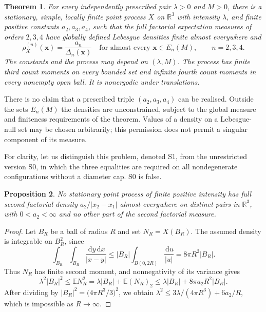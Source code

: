 \documentclass[11pt,a4paper]{article}
\numberwithin{equation}{section}
\newtheorem{theorem}{Theorem}[section]
\newtheorem{proposition}[theorem]{Proposition}
\theoremstyle{definition}
\theoremstyle{remark}
\newcommand{\R}{\mathbb R}
\newcommand{\E}{\mathbb E}
\newcommand{\dd}{\,\mathrm d}
\begin{document}
\begin{theorem}\label{thm:main}
For every independently prescribed pair $\lambda>0$ and $M>0$, there is a
stationary, simple, locally finite point process $X$ on $\R^3$ with intensity
$\lambda$, and finite positive constants $a_2,a_3,a_4$, such that the full
factorial expectation measures of orders $2,3,4$ have globally defined
Lebesgue densities finite almost everywhere and
\begin{equation}
 \rho_X^{(n)}(\mathbf x)=\frac{a_n}{\Delta_n(\mathbf x)}
 \quad\text{for almost every }\mathbf x\in E_n(M),\qquad n=2,3,4.
 \label{eq:target}
\end{equation}
The constants and the process may depend on $(\lambda,M)$.
The process has finite third count moments on every bounded set and
infinite fourth count moments in every nonempty open ball. It is
nonergodic under translations.
\end{theorem}

There is no claim that a prescribed triple $(a_2,a_3,a_4)$ can be realised.
Outside the sets $E_n(M)$ the densities are unconstrained, subject to the
global measure and finiteness requirements of the theorem. Values of a
density on a Lebesgue-null set may be chosen arbitrarily; this permission
does not permit a singular component of its measure.

For clarity, let us distinguish this problem, denoted S1, from the
unrestricted version S0, in which the three equalities are required on all
nondegenerate configurations without a diameter cap. S0 is false.

\begin{proposition}\label{prop:global-obstruction}
No stationary point process of finite positive intensity has full second
factorial density $a_2/|x_2-x_1|$ almost everywhere on distinct pairs in
$\R^3$, with $0<a_2<\infty$ and no other part of the second factorial
measure.
\end{proposition}
\begin{proof}
Let $B_R$ be a ball of radius $R$ and set $N_R=X(B_R)$. The assumed density
is integrable on $B_R^2$, since
\[
 \int_{B_R}\int_{B_R}\frac{\dd y\dd x}{|x-y|}
 \leq |B_R|\int_{B(0,2R)}\frac{\dd u}{|u|}
 =8\pi R^2|B_R|.
\]
Thus $N_R$ has finite second moment, and nonnegativity of its variance gives
\[
 \lambda^2|B_R|^2
 \leq \E N_R^2
 =\lambda|B_R|+\E(N_R)_2
 \leq \lambda|B_R|+8\pi a_2R^2|B_R|.
\]
After dividing by $|B_R|^2=\bigl(4\pi R^3/3\bigr)^2$, we obtain
$\lambda^2\leq3\lambda/(4\pi R^3)+6a_2/R$, which is impossible as
$R\to\infty$.
\end{proof}
\end{document}

